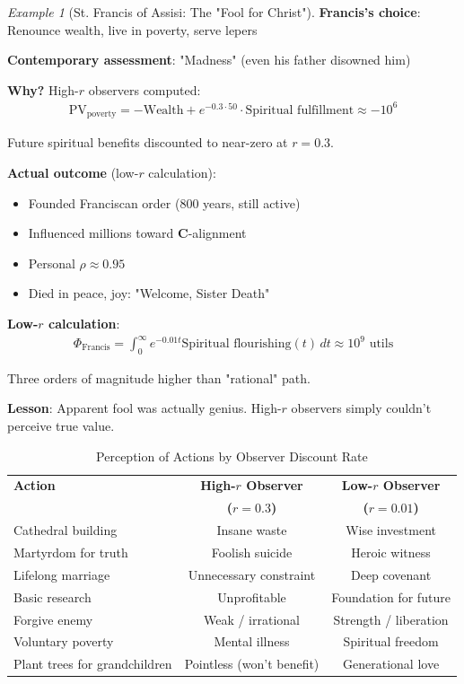 \documentclass[11pt,a4paper]{article}
\theoremstyle{definition}
\theoremstyle{remark}
\newtheorem{example}{Example}[section]
\begin{document}
\begin{enumerate}
\begin{example}[St. Francis of Assisi: The "Fool for Christ"]
\textbf{Francis's choice}: Renounce wealth, live in poverty, serve lepers

\textbf{Contemporary assessment}: "Madness" (even his father disowned him)

\textbf{Why?} High-\(r\) observers computed:
\begin{align}
\text{PV}_{\text{poverty}} = -\text{Wealth} + e^{-0.3 \cdot 50} \cdot \text{Spiritual fulfillment} \approx -10^6
\end{align}

Future spiritual benefits discounted to near-zero at \(r = 0.3\).

\textbf{Actual outcome} (low-\(r\) calculation):
\begin{itemize}
    \item Founded Franciscan order (800 years, still active)
    \item Influenced millions toward \(\mathbf{C}\)-alignment
    \item Personal \(\rho \approx 0.95\)
    \item Died in peace, joy: "Welcome, Sister Death"
\end{itemize}

\textbf{Low-\(r\) calculation}:
\begin{align}
\Phi_{\text{Francis}} = \int_0^\infty e^{-0.01t} \text{Spiritual flourishing}(t) \, dt \approx 10^9 \text{ utils}
\end{align}

Three orders of magnitude higher than "rational" path.

\textbf{Lesson}: Apparent fool was actually genius. High-\(r\) observers simply couldn't perceive true value.
\end{example}

\begin{table}[H]
\centering
\caption{Perception of Actions by Observer Discount Rate}
\label{tab:wisdom_foolishness}
\begin{tabular}{|l|c|c|}
\hline
\textbf{Action} & \textbf{High-\(r\) Observer} & \textbf{Low-\(r\) Observer} \\
& \textbf{(\(r=0.3\))} & \textbf{(\(r=0.01\))} \\
\hline
Cathedral building & Insane waste & Wise investment \\
\hline
Martyrdom for truth & Foolish suicide & Heroic witness \\
\hline
Lifelong marriage & Unnecessary constraint & Deep covenant \\
\hline
Basic research & Unprofitable & Foundation for future \\
\hline
Forgive enemy & Weak / irrational & Strength / liberation \\
\hline
Voluntary poverty & Mental illness & Spiritual freedom \\
\hline
Plant trees for grandchildren & Pointless (won't benefit) & Generational love \\
\hline
\end{tabular}
\end{table}


\end{enumerate}
\end{document}
